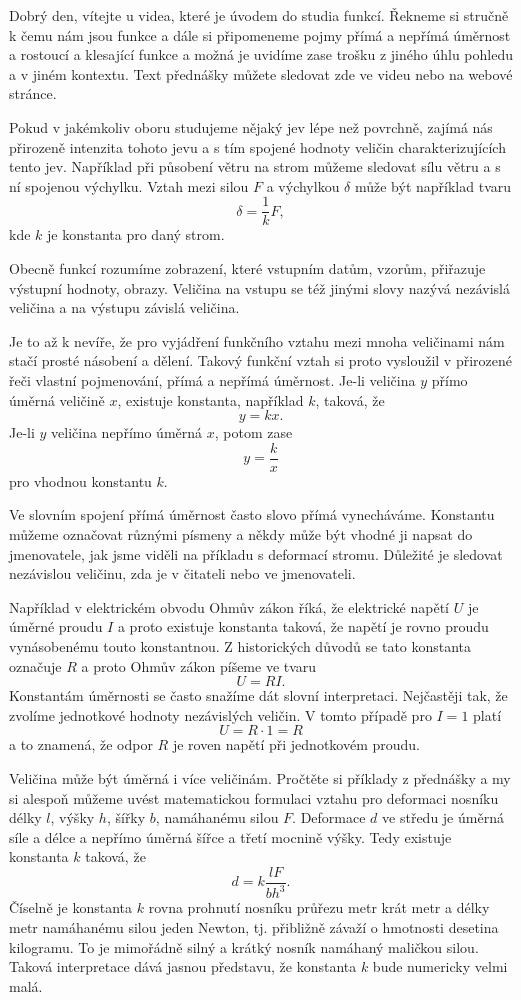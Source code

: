 \documentclass[12pt]{article}
\begin{document}
Dobrý den, vítejte u videa, které je úvodem do studia funkcí. Řekneme si stručně k čemu nám jsou funkce a dále si připomeneme pojmy přímá a nepřímá úměrnost a rostoucí a klesající funkce a možná je uvidíme zase trošku z jiného úhlu pohledu a v jiném kontextu. Text přednášky můžete sledovat zde ve videu nebo na webové stránce.

Pokud v jakémkoliv oboru studujeme nějaký jev lépe než povrchně, zajímá nás přirozeně intenzita tohoto jevu a s tím spojené hodnoty veličin charakterizujících tento jev. Například při působení větru na strom můžeme sledovat sílu větru a s ní spojenou výchylku. Vztah mezi silou $F$ a výchylkou $\delta$ může být například tvaru $$\delta=\frac 1k F,$$ kde $k$ je konstanta pro daný strom.

Obecně funkcí rozumíme zobrazení, které vstupním datům, vzorům, přiřazuje výstupní hodnoty, obrazy. Veličina na vstupu se též jinými slovy nazývá nezávislá veličina a na výstupu závislá veličina.

Je to až k nevíře, že pro vyjádření funkčního vztahu mezi mnoha veličinami nám stačí prosté násobení a dělení. Takový funkční vztah si proto vysloužil v přirozené řeči vlastní pojmenování, přímá a nepřímá úměrnost. Je-li veličina $y$ přímo úměrná veličině $x$, existuje konstanta, například $k$, taková, že $$y=kx.$$ Je-li $y$ veličina nepřímo úměrná $x$, potom zase $$y=\frac kx$$ pro vhodnou konstantu $k$.

Ve slovním spojení přímá úměrnost často slovo přímá vynecháváme. Konstantu můžeme označovat různými písmeny a někdy může být vhodné ji napsat do jmenovatele, jak jsme viděli na příkladu s deformací stromu. Důležité je sledovat nezávislou veličinu, zda je v čitateli nebo ve jmenovateli.

Například v elektrickém obvodu Ohmův zákon říká, že elektrické napětí $U$ je úměrné proudu $I$ a proto existuje konstanta taková, že napětí je rovno proudu vynásobenému touto konstantnou. Z historických důvodů se tato konstanta označuje $R$ a proto Ohmův zákon píšeme ve tvaru $$U=RI.$$ Konstantám úměrnosti se často snažíme dát slovní interpretaci. Nejčastěji tak, že zvolíme jednotkové hodnoty nezávislých veličin. V tomto případě pro $I=1$ platí $$U=R\cdot 1=R$$ a to znamená, že odpor $R$ je roven napětí při jednotkovém proudu.

Veličina může být úměrná i více veličinám. Pročtěte si příklady z přednášky a my si alespoň můžeme uvést matematickou formulaci vztahu pro deformaci nosníku délky $l$, výšky $h$, šířky $b$, namáhanému silou $F$. Deformace $d$ ve středu je úměrná síle a délce a nepřímo úměrná šířce a třetí mocnině výšky. Tedy existuje konstanta $k$ taková, že $$d=k\frac {l F}{b h^3}.$$ Číselně je konstanta $k$ rovna prohnutí nosníku průřezu metr krát metr a délky metr namáhanému silou jeden Newton, tj. přibližně závaží o hmotnosti desetina kilogramu. To je mimořádně silný a krátký nosník namáhaný maličkou silou. Taková interpretace dává jasnou představu, že konstanta $k$ bude numericky velmi malá.
\end{document}
